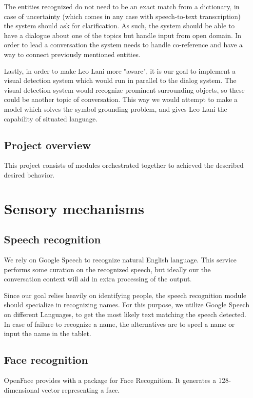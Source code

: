 \documentclass[a4paper]{article}
\begin{document}
The entities recognized do not need to be an exact match from a dictionary, in case of uncertainty (which comes in any case with speech-to-text transcription) the system should ask for clarification. As such, the system should be able to have a dialogue about one of the topics but handle input from open domain. In order to lead a conversation the system needs to handle co-reference and have a way to connect previously mentioned entities. 

Lastly, in order to make Leo Lani more "aware", it is our goal to implement a visual detection system which would run in parallel to the dialog system. The visual detection system would recognize prominent surrounding objects, so these could be another topic of conversation. This way we would attempt to make a model which solves the symbol grounding problem, and gives Leo Lani the capability of situated language. 

\subsection{Project overview}
This project consists of modules orchestrated together to achieved the described desired behavior. 


\newpage
\section{Sensory mechanisms}

\subsection{Speech recognition}
We rely on Google Speech to recognize natural English language. This service performs some curation on the recognized speech, but ideally our the conversation context will aid in extra processing of the output.

Since our goal relies heavily on identifying people, the speech recognition module should specialize in recognizing names. For this purpose, we utilize Google Speech on different Languages, to get the most likely text matching the speech detected. In case of failure to recognize a name, the alternatives are to speel a name or input the name in the tablet. 

\subsection{Face recognition}
OpenFace provides with a package for Face Recognition. It generates a 128-dimensional vector representing a face. 
\end{document}
